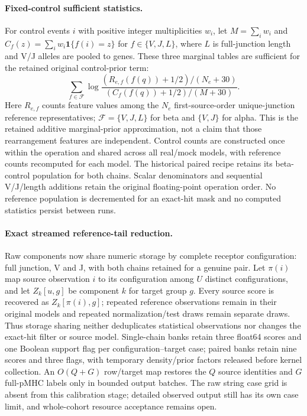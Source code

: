 \documentclass[10pt,a4paper]{article}
\theoremstyle{definition}
\begin{document}
\paragraph{Fixed-control sufficient statistics.}
For control events $i$ with positive integer multiplicities $w_i$, let
$M=\sum_i w_i$ and $C_f(z)=\sum_i w_i\mathbf1\{f(i)=z\}$ for
$f\in\{V,J,L\}$, where $L$ is full-junction length and V/J alleles are pooled to genes.
These three marginal tables are sufficient for the retained original control-prior term:
\[
 \sum_{f\in\mathcal F}\log\frac{(R_{e,f}(f(q))+1/2)/(N_e+30)}
                                  {(C_f(f(q))+1/2)/(M+30)}.
\]
Here $R_{e,f}$ counts feature values among the $N_e$ first-source-order unique-junction reference representatives;
$\mathcal F=\{V,J,L\}$ for beta and $\{V,J\}$ for alpha.
This is the retained additive marginal-prior approximation, not a claim that those rearrangement features are independent.
Control counts are constructed once within the operation and shared across all real/mock models, with reference counts recomputed for each model.
The historical paired recipe retains its beta-control population for both chains.
Scalar denominators and sequential V/J/length additions retain the original floating-point operation order.
No reference population is decremented for an exact-hit mask and no computed statistics persist between runs.

\paragraph{Exact streamed reference-tail reduction.}
Raw components now share numeric storage by complete receptor configuration: full junction, V and J, with both chains retained for a genuine pair.
Let $\pi(i)$ map source observation $i$ to its configuration among $U$ distinct configurations, and let $Z_k[u,g]$ be component $k$ for target group $g$.
Every source score is recovered as $Z_k[\pi(i),g]$; repeated reference observations remain in their original models and repeated normalization/test draws remain separate draws.
Thus storage sharing neither deduplicates statistical observations nor changes the exact-hit filter or source model.
Single-chain banks retain three float64 scores and one Boolean support flag per configuration--target case; paired banks retain nine scores and three flags, with temporary density/prior factors released before kernel collection.
An $O(Q+G)$ row/target map restores the $Q$ source identities and $G$ full-pMHC labels only in bounded output batches.
The raw string case grid is absent from this calibration stage; detailed observed output still has its own case limit, and whole-cohort resource acceptance remains open.
\end{document}
